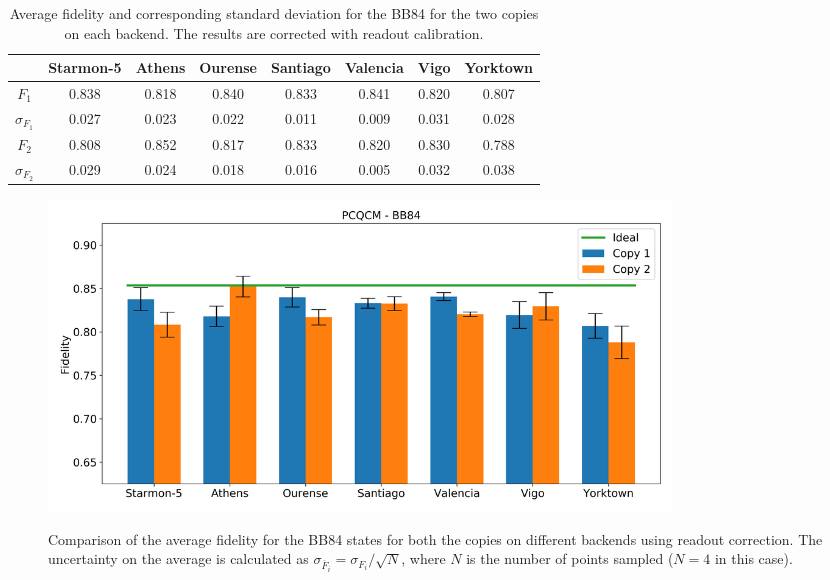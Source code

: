 \begin{table}[H]
  \centering
  \begin{tabular}{|c|c|c|c|c|c|c|c|}
  \hline
  \textbf{} & \textbf{Starmon-5} & \textbf{Athens} & \textbf{Ourense} & \textbf{Santiago} & \textbf{Valencia} & \textbf{Vigo} & \textbf{Yorktown} \\ \hline
  $F_1$              & 0.838 & 0.818 & 0.840 & 0.833 & 0.841 & 0.820 & 0.807 \\ \hline
  $\sigma_{F_1}$     & 0.027 & 0.023 & 0.022 & 0.011 & 0.009 & 0.031 & 0.028 \\ \hline
  $F_2$              & 0.808 & 0.852 & 0.817 & 0.833 & 0.820 & 0.830 & 0.788 \\ \hline
  $\sigma_{F_2}$     & 0.029 & 0.024 & 0.018 & 0.016 & 0.005 & 0.032 & 0.038 \\ \hline
  \end{tabular}
  \caption{Average fidelity and corresponding standard deviation for the BB84 for the two copies on each backend. The results are corrected with readout calibration.}
  \label{tab:results_pcqcm_bb84_corrected}
\end{table}
\begin{figure}[H]
  \centering
          \includegraphics[width=0.8\textwidth]{Figures/PhaseCovariant/Histograms/histo_bb84_corrected.png}
      \label{fig:pc_histo_bb84_corrected}
      \caption{Comparison of the average fidelity for the BB84 states for both the copies on different backends using readout correction. The uncertainty on the average is calculated as $\sigma_{\overline{F}_i}=\sigma_{F_i}/\sqrt{N}$, where $N$ is the number of points sampled ($N=4$ in this case).}
\end{figure}

